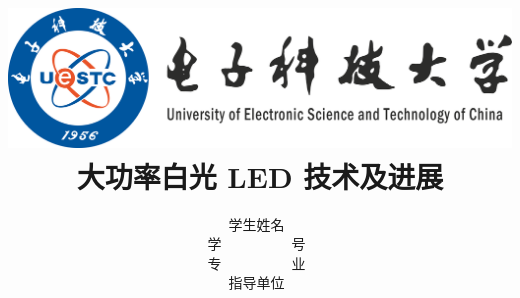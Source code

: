 \documentclass[titlepage,11pt,a4paper]{article}
\title{\includegraphics[scale=0.06]{logo.pdf}\\\song 大功率白光 LED 技术及进展}
\author{\song 学生姓名~\makebox[10em][c]{\uline{\hfill \hfill}}\\
	\song 学~~~~~~~~~~号~\makebox[10em][c]{\uline{\hfill \hfill}}\\
	\song 专~~~~~~~~~~业~\makebox[10em][c]{\uline{\hfill \hfill}}\\
	\song 指导单位~\makebox[10em][c]{\uline{\hfill 电子科技大学\hfill}}}
\date{}
\begin{document}
\small
\begin{CJK}{UTF8}{gbsn}

\maketitle



{\centering \tableofcontents}
\newpage



\end{CJK}
\end{document}
